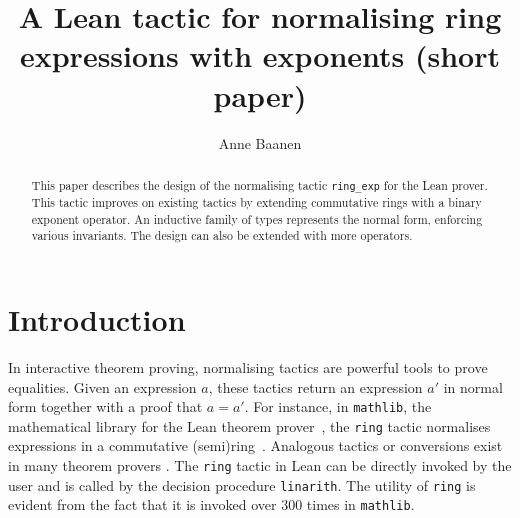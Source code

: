 \documentclass{llncs}
\title{A Lean tactic for normalising ring\\ expressions with exponents (short paper)}
\author{Anne Baanen\orcidID{0000-0001-8497-3683}}
\institute{Vrije Universiteit Amsterdam, Amsterdam, The Netherlands\\\email{t.baanen@vu.nl}}
\newcommand{\lean}[1]{\texttt{#1}\xspace} %
\newcommand{\mathlib}{\texttt{mathlib}\xspace}
\newcommand{\ring}{\lean{ring}}
\newcommand{\ringexp}{\lean{ring\_exp}}
\begin{document}
\maketitle

\begin{abstract}
This paper describes the design of the normalising tactic \ringexp for the Lean prover.
This tactic improves on existing tactics by extending commutative rings with a binary exponent operator.
An inductive family of types represents the normal form, enforcing various invariants.
The design can also be extended with more operators.
\end{abstract}

\section{Introduction}

In interactive theorem proving, normalising tactics are powerful tools to prove equalities.
Given an expression $a$, these tactics return an expression $a'$ in normal form together with a proof that $a = a'$.
For instance, in \mathlib, the mathematical library for the Lean theorem prover~\cite{lean-prover},
the \ring tactic normalises %
expressions in a commutative (semi)ring~\cite{mathlib}.
Analogous tactics or conversions exist in many theorem provers \cite{hol_light, isabelle_hol, agda-stdlib}.
The \ring tactic in Lean can be directly invoked by the user
and is called by the decision procedure \lean{linarith}.
The utility of \ring is evident from the fact that it is invoked over 300 times in \mathlib.
\end{document}
